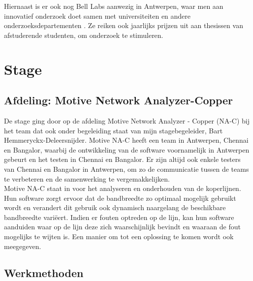 \documentclass[10pt,a4paper]{article}
\begin{document}
Hiernaast is er ook nog Bell Labs aanwezig in Antwerpen, waar men aan innovatief onderzoek doet samen met universiteiten en andere onderzoeksdepartementen . Ze reiken ook jaarlijks prijzen uit aan thesissen van afstuderende studenten, om onderzoek te stimuleren. 

\section{Stage}
\label{stage}
\subsection{Afdeling: Motive Network Analyzer-Copper}
\label{afdeling}
De stage ging door op de afdeling Motive Network Analyzer - Copper (NA-C) bij het team dat ook onder begeleiding staat van mijn stagebegeleider, Bart Hemmeryckx-Deleersnijder. Motive NA-C heeft een team in Antwerpen, Chennai en Bangalor, waarbij de ontwikkeling van de software voornamelijk in Antwerpen gebeurt en het testen in Chennai en Bangalor. Er zijn altijd ook enkele testers van Chennai en Bangalor in Antwerpen, om zo de communicatie tussen de teams te verbeteren en de samenwerking te vergemakkelijken.\\
Motive NA-C staat in voor het analyseren en onderhouden van de koperlijnen. Hun software zorgt ervoor dat de bandbreedte zo optimaal mogelijk gebruikt wordt en verandert dit gebruik ook dynamisch naargelang de beschikbare bandbreedte vari\"eert. Indien er fouten optreden op de lijn, kan hun software aanduiden waar op de lijn deze zich waarschijnlijk bevindt en waaraan de fout mogelijks te wijten is. Een manier om tot een oplossing te komen wordt ook meegegeven.
\subsection{Werkmethoden}
\label{methoden}
\end{document}
